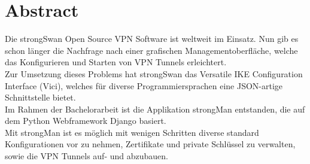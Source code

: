 \section{Abstract}
Die strongSwan Open Source VPN Software ist weltweit im Einsatz. Nun gib es schon länger die Nachfrage nach einer grafischen Managementoberfläche, welche das Konfigurieren und Starten von VPN Tunnels erleichtert.\\
Zur Umsetzung dieses Problems hat strongSwan das Versatile IKE Configuration Interface (Vici), welches für diverse Programmiersprachen eine JSON-artige Schnittstelle bietet. \\
Im Rahmen der Bachelorarbeit ist die Applikation strongMan entstanden, die auf dem Python Webframework Django basiert.\\
Mit strongMan ist es möglich mit wenigen Schritten diverse standard Konfigurationen vor zu nehmen, Zertifikate und private Schlüssel zu verwalten, sowie die VPN Tunnels auf- und abzubauen.

